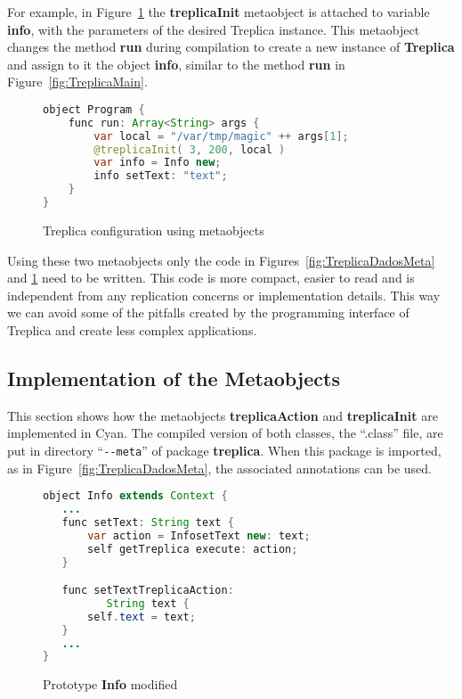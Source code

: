 \documentclass[preprint,review]{elsarticle}
\newcommand{\srcstyle}[1]{\ttfamily\textbf{#1}\rmfamily}
\begin{document}
For     example,     in     Figure~\ref{fig:TreplicaMainMeta}     the
\srcstyle{treplicaInit}   metaobject    is   attached    to   variable
\srcstyle{info}, with the parameters of the desired Treplica instance.
This metaobject  changes the method \srcstyle{run}  during compilation
to create a  new instance of \srcstyle{Treplica} and assign  to it the
object  \srcstyle{info},  similar  to  the  method  \srcstyle{run}  in
Figure~\ref{fig:TreplicaMain}.

\begin{figure}[h]
\centering
\begin{lstlisting}[language=Java]
object Program {
    func run: Array<String> args {
        var local = "/var/tmp/magic" ++ args[1];
        @treplicaInit( 3, 200, local )
        var info = Info new;
        info setText: "text";
    }
}
\end{lstlisting}
\caption{Treplica configuration using metaobjects}
\label{fig:TreplicaMainMeta}
\end{figure}

Using     these    two     metaobjects     only     the    code     in
Figures~\ref{fig:TreplicaDadosMeta}   and   \ref{fig:TreplicaMainMeta}
need to be written.  This code is more compact, easier  to read and is
independent from  any replication concerns or  implementation details.
This way we can avoid some  of the pitfalls created by the programming
interface of Treplica and create less complex applications.


\subsection{Implementation of the Metaobjects}

This section shows how the metaobjects \srcstyle{treplicaAction} and \srcstyle{treplicaInit} are implemented in Cyan. The compiled version of both classes, the ``.class'' file, are put in directory ``\verb|--meta|''  of  package   \srcstyle{treplica}. When this package is imported, as in Figure~\ref{fig:TreplicaDadosMeta}, the associated annotations can be used.



\begin{figure}[h]
\centering
\begin{lstlisting}[language=Java]
object Info extends Context {
   ...
   func setText: String text {
       var action = InfosetText new: text;
       self getTreplica execute: action;
   }

   func setTextTreplicaAction:
          String text {
       self.text = text;
   }
   ...
}
\end{lstlisting}
\caption{Prototype \srcstyle{Info} modified}
\label{fig:InfoChange}
\end{figure}
\end{document}
